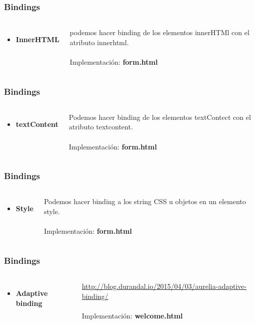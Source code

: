 \documentclass{beamer}
\begin{document}
\begin{frame}
\frametitle{Bindings}
\begin{columns}[c]
\begin{itemize}
\item \textbf{InnerHTML}
\end{itemize}
podemos hacer binding de los elementos innerHTMl con el atributo innerhtml.
\\~\\
Implementaci\'on: \textbf{form.html}
\end{columns}
\end{frame}
\begin{frame}
\frametitle{Bindings}
\begin{columns}[c]
\begin{itemize}
\item \textbf{textContent}
\end{itemize}
Podemos hacer binding de los elementos textContect con el atributo textcontent.
\\~\\
Implementaci\'on: \textbf{form.html}
\end{columns}
\end{frame}
\begin{frame}
\frametitle{Bindings}
\begin{columns}[c]
\begin{itemize}
\item \textbf{Style}
\end{itemize}
Podemos hacer binding a los string CSS u objetos en un elemento style.
\\~\\
Implementaci\'on: \textbf{form.html}
\end{columns}
\end{frame}
\begin{frame}
\frametitle{Bindings}
\begin{columns}[c]
\begin{itemize}
\item \textbf{Adaptive binding}
\end{itemize}
{\color{blue}\url{http://blog.durandal.io/2015/04/03/aurelia-adaptive-binding/}}
\\~\\
Implementaci\'on: \textbf{welcome.html}
\end{columns}
\end{frame}
\end{document}
